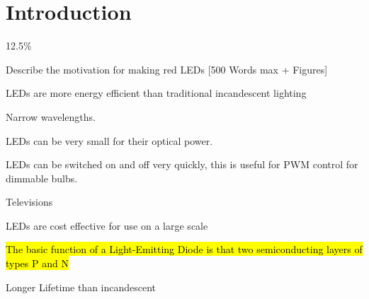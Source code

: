 \newpage
\section{Introduction}
\label{sec:intro}

12.5\%

Describe the motivation for making red LEDs [500 Words max + Figures]

LEDs are more energy efficient than traditional incandescent lighting

Narrow wavelengths.

LEDs can be very small for their optical power.

LEDs can be switched on and off very quickly, this is useful for PWM control for dimmable bulbs.

Televisions

LEDs are cost effective for use on a large scale

\hl{The basic function of a Light-Emitting Diode is that two semiconducting layers of types P and N }

Longer Lifetime than incandescent

\cite{einstein}

%
% 
%
%
%
%
%
%
%
%
%
%
%
%
% 
